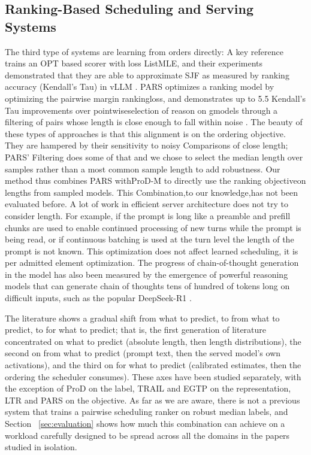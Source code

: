 \documentclass[conference]{IEEEtran}
\begin{document}
\subsection{Ranking-Based Scheduling and Serving Systems}
The third type of systems are learning from orders directly: A key reference trains an OPT based scorer with loss ListMLE, and their experiments demonstrated that they are able to approximate SJF as measured by ranking accuracy (Kendall’s Tau) in vLLM \cite{fu2024efficient}. PARS optimizes a ranking model by optimizing the pairwise margin rankingloss, and demonstrates up to 5.5 Kendall's Tau improvements over pointwiseselection of reason on gmodels through a filtering of pairs whose length is close enough to fall within noise \cite{tao2025pars}. The beauty of these types of approaches is that this alignment is on the ordering objective. They are hampered by their sensitivity to noisy Comparisons of close length; PARS' Filtering does some of that and we chose to select the median length over samples rather than a most common sample length to add robustness. Our method thus combines PARS withProD-M to directly use the ranking objectiveon lengths from sampled models. This Combination,to our knowledge,has not been evaluated before. A lot of work in efficient server architecture does not try to consider length. For example, if the prompt is long like a preamble and prefill chunks are used to enable continued processing of new turns while the prompt is being read, or if continuous batching is used at the turn level \cite{yu2022orca,kwon2023pagedattention,agrawal2024sarathi} the length of the prompt is not known. This optimization does not affect learned scheduling, it is per admitted element optimization. The progress of chain-of-thought generation in the model has also been measured by the emergence of powerful reasoning models that can generate chain of thoughts tens of hundred of tokens long on difficult inputs, such as the popular DeepSeek-R1 \cite{guo2025deepseekr1}.

The literature shows a gradual shift from what to predict, to from what to predict, to for what to predict; that is, the first generation of literature concentrated on what to predict (absolute length, then length distributions), the second on from what to predict (prompt text, then the served model's own activations), and the third on for what to predict (calibrated estimates, then the ordering the scheduler consumes). These axes have been studied separately, with the exception of ProD on the label, TRAIL and EGTP on the representation, LTR and PARS on the objective. As far as we are aware, there is not a previous system that trains a pairwise scheduling ranker on robust median labels, and Section ~\ref{sec:evaluation} shows how much this combination can achieve on a workload carefully designed to be spread across all the domains in the papers studied in isolation.
\end{document}
